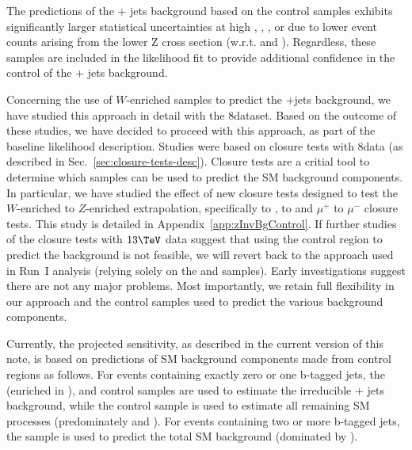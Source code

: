 The predictions of the \znunu + jets background based on the \zmmj
control samples exhibits significantly larger statistical
uncertainties at high \njet, \nb, \scalht, or \mht due to lower event
counts arising from the lower Z cross section (w.r.t. \gj and
\wj). Regardless, these samples are included in the likelihood fit
to provide additional confidence in the control of the \znunu + jets
background.

Concerning the use of $W$-enriched samples to predict the \znunu +jets
background, we have studied this approach
in detail with the 8\TeV dataset. Based on the outcome of these studies,
we have decided to proceed with this approach, as part
of the baseline likelihood description. Studies were
based on closure tests with 8\TeV data
(as described in Sec.~\ref{sec:closure-tests-desc}). Closure tests are a critial
tool to determine which samples can be used to predict the SM
background components. In particular, we have studied the effect of
new closure tests designed to test the $W$-enriched to $Z$-enriched
extrapolation, specifically \mj to \gj, \mj to \mmj
and $\mu^{+}$ to $\mu^{-}$ closure tests. This study is detailed in Appendix~\ref{app:zInvBgControl}.
If further studies of the closure tests with $13\tev$
data suggest that using the \mj control region to predict the \znunu
background is not feasible, we will revert back to the approach
used in Run~I analysis (\ie relying solely on the \zll and \gj
samples). Early investigations suggest there are not any major problems.
Most importantly, we retain full flexibility in our approach and the
control samples used to predict the various background components.

Currently, the projected sensitivity, as described in the current
version of this note, is based on predictions of SM background
components made from control regions as follows. For events containing
exactly zero or one b-tagged jets, the \mj (enriched in \wej), \gj and
\mmj control samples are used to estimate the irreducible \znunu + jets
background, while the \mj control sample is used to estimate all
remaining SM processes (predominately \wj and \ttbar). For events
containing two or more b-tagged jets, the \mj sample is
used to predict the total SM background (dominated by \ttbar).

